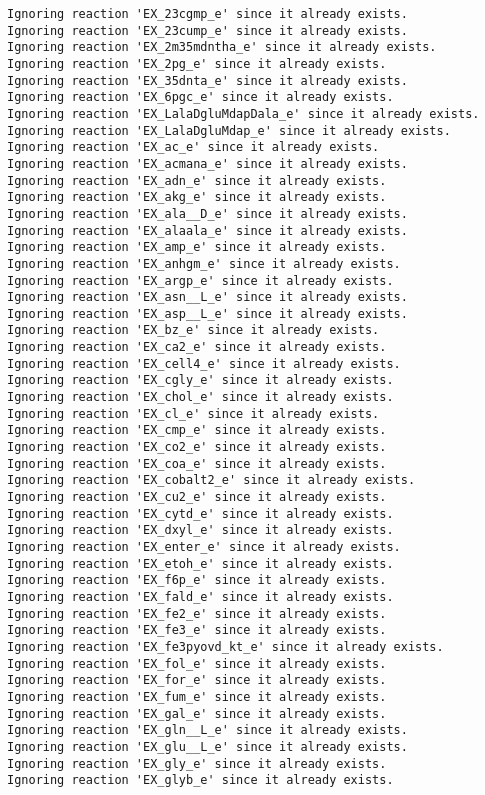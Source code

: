 \documentclass[
  letterpaper,
  DIV=11,
  numbers=noendperiod]{scrartcl}
\begin{document}
\begin{verbatim}
Ignoring reaction 'EX_23cgmp_e' since it already exists.
Ignoring reaction 'EX_23cump_e' since it already exists.
Ignoring reaction 'EX_2m35mdntha_e' since it already exists.
Ignoring reaction 'EX_2pg_e' since it already exists.
Ignoring reaction 'EX_35dnta_e' since it already exists.
Ignoring reaction 'EX_6pgc_e' since it already exists.
Ignoring reaction 'EX_LalaDgluMdapDala_e' since it already exists.
Ignoring reaction 'EX_LalaDgluMdap_e' since it already exists.
Ignoring reaction 'EX_ac_e' since it already exists.
Ignoring reaction 'EX_acmana_e' since it already exists.
Ignoring reaction 'EX_adn_e' since it already exists.
Ignoring reaction 'EX_akg_e' since it already exists.
Ignoring reaction 'EX_ala__D_e' since it already exists.
Ignoring reaction 'EX_alaala_e' since it already exists.
Ignoring reaction 'EX_amp_e' since it already exists.
Ignoring reaction 'EX_anhgm_e' since it already exists.
Ignoring reaction 'EX_argp_e' since it already exists.
Ignoring reaction 'EX_asn__L_e' since it already exists.
Ignoring reaction 'EX_asp__L_e' since it already exists.
Ignoring reaction 'EX_bz_e' since it already exists.
Ignoring reaction 'EX_ca2_e' since it already exists.
Ignoring reaction 'EX_cell4_e' since it already exists.
Ignoring reaction 'EX_cgly_e' since it already exists.
Ignoring reaction 'EX_chol_e' since it already exists.
Ignoring reaction 'EX_cl_e' since it already exists.
Ignoring reaction 'EX_cmp_e' since it already exists.
Ignoring reaction 'EX_co2_e' since it already exists.
Ignoring reaction 'EX_coa_e' since it already exists.
Ignoring reaction 'EX_cobalt2_e' since it already exists.
Ignoring reaction 'EX_cu2_e' since it already exists.
Ignoring reaction 'EX_cytd_e' since it already exists.
Ignoring reaction 'EX_dxyl_e' since it already exists.
Ignoring reaction 'EX_enter_e' since it already exists.
Ignoring reaction 'EX_etoh_e' since it already exists.
Ignoring reaction 'EX_f6p_e' since it already exists.
Ignoring reaction 'EX_fald_e' since it already exists.
Ignoring reaction 'EX_fe2_e' since it already exists.
Ignoring reaction 'EX_fe3_e' since it already exists.
Ignoring reaction 'EX_fe3pyovd_kt_e' since it already exists.
Ignoring reaction 'EX_fol_e' since it already exists.
Ignoring reaction 'EX_for_e' since it already exists.
Ignoring reaction 'EX_fum_e' since it already exists.
Ignoring reaction 'EX_gal_e' since it already exists.
Ignoring reaction 'EX_gln__L_e' since it already exists.
Ignoring reaction 'EX_glu__L_e' since it already exists.
Ignoring reaction 'EX_gly_e' since it already exists.
Ignoring reaction 'EX_glyb_e' since it already exists.

\end{verbatim}
\end{document}
